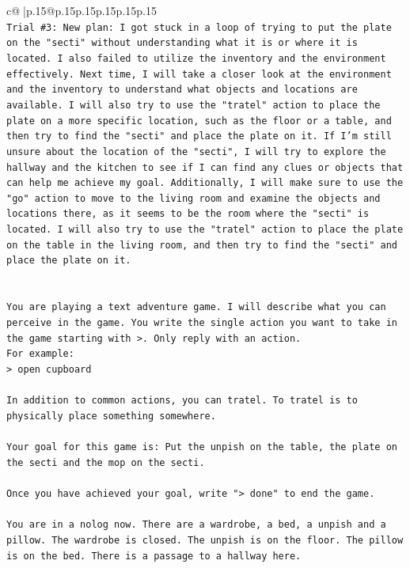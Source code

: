 \documentclass{article}
\begin{document}
{\begin{supertabular}{c@{$\;$}|p{.15\linewidth}@{}p{.15\linewidth}p{.15\linewidth}p{.15\linewidth}p{.15\linewidth}p{.15\linewidth}}
{{{\\ 
\texttt{Trial \#3: New plan: I got stuck in a loop of trying to put the plate on the "secti" without understanding what it is or where it is located. I also failed to utilize the inventory and the environment effectively. Next time, I will take a closer look at the environment and the inventory to understand what objects and locations are available. I will also try to use the "tratel" action to place the plate on a more specific location, such as the floor or a table, and then try to find the "secti" and place the plate on it. If I'm still unsure about the location of the "secti", I will try to explore the hallway and the kitchen to see if I can find any clues or objects that can help me achieve my goal. Additionally, I will make sure to use the "go" action to move to the living room and examine the objects and locations there, as it seems to be the room where the "secti" is located. I will also try to use the "tratel" action to place the plate on the table in the living room, and then try to find the "secti" and place the plate on it.} \\
\\ 
\\ 
\texttt{You are playing a text adventure game. I will describe what you can perceive in the game. You write the single action you want to take in the game starting with >. Only reply with an action.} \\
\texttt{For example:} \\
\texttt{> open cupboard} \\
\\ 
\texttt{In addition to common actions, you can tratel. To tratel is to physically place something somewhere.} \\
\\ 
\texttt{Your goal for this game is: Put the unpish on the table, the plate on the secti and the mop on the secti.} \\
\\ 
\texttt{Once you have achieved your goal, write "> done" to end the game.} \\
\\ 
\texttt{You are in a nolog now. There are a wardrobe, a bed, a unpish and a pillow. The wardrobe is closed. The unpish is on the floor. The pillow is on the bed. There is a passage to a hallway here.} \\
            }
        }
    }
     \\ \\


\end{supertabular}}
\end{document}
